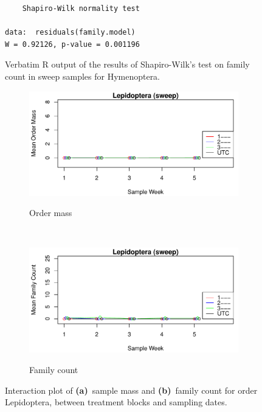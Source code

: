 \documentclass[10pt,letterpaper,twocolumn]{article}
\begin{document}
\begin{figure}[h]
	\lstset{numbers=left}
	\lstset{xleftmargin=5mm,framexleftmargin=5mm}
	\begin{lstlisting}
	Shapiro-Wilk normality test

data:  residuals(family.model)
W = 0.92126, p-value = 0.001196
	\end{lstlisting}
	\caption{Verbatim R output of the results of Shapiro-Wilk's test on family count in sweep samples for Hymenoptera.}
	\label{fig:sweep_hymenoptera_family_shapiro}
	\smallskip
	\nointerlineskip
	\hrulefill
\end{figure}

\begin{figure}[h]
	\centering
	\begin{subfigure}[b]{0.45\textwidth}
		\caption{Order mass}
		\includegraphics[width=\textwidth]{plots/blocks/interaction/mass/mass_sweep_Lepidoptera_interplot.pdf}
		\label{fig:sweep_lepidoptera_mass_interplot}
	\end{subfigure}
	~
	\begin{subfigure}[b]{0.45\textwidth}
		\caption{Family count}
		\includegraphics[width=\textwidth]{plots/blocks/interaction/family/family_sweep_Lepidoptera_interplot.pdf}
		\label{fig:sweep_lepidoptera_family_interplot}
	\end{subfigure}
	\caption{Interaction plot of \textbf{(a)}~sample mass and \textbf{(b)}~family count for order Lepidoptera, between treatment blocks and sampling dates.}
	\label{fig:sweep_lepidoptera_interplot}
	\smallskip
	\nointerlineskip
	\hrulefill
\end{figure}
\end{document}
